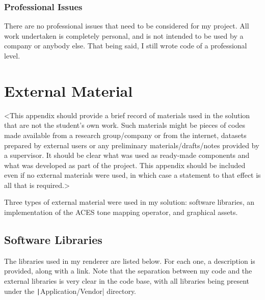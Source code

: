 \begin{appendices}
\subsection{Professional Issues}

There are no professional issues that need to be considered for my project. All work undertaken is completely personal, and is not intended to be used by a company or anybody else. That being said, I still wrote code of a professional level.

\chapter{External Material} \label{ExternalMaterial}
<This appendix should provide a brief record of materials used in the solution that are not the student's own work. Such materials might be pieces of codes made available from a research group/company or from the internet, datasets prepared by external users or any preliminary materials/drafts/notes provided by a supervisor. It should be clear what was used as ready-made components and what was developed as part of the project. This appendix should be included even if no external materials were used, in which case a statement to that effect is all that is required.>

Three types of external material were used in my solution: software libraries, an implementation of the ACES tone mapping operator, and graphical assets.

\section{Software Libraries} \label{SoftwareLibraries}

The libraries used in my renderer are listed below. For each one, a description is provided, along with a link. Note that the separation between my code and the external libraries is very clear in the code base, with all libraries being present under the \texttt|Application/Vendor| directory.

\vspace{20pt}


\end{appendices}
